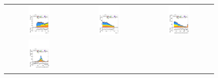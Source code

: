 \begin{figure}[htbp]
    \centering
    \setlength{\tabcolsep}{1.5pt}
    \renewcommand{\arraystretch}{0}
  
    \begin{tabular}{@{}c c c@{}}
      \includegraphics[width=0.33\textwidth]{images/modelling_tmva_vars/plot_ditau_dr_hh_tth.pdf} &
      \includegraphics[width=0.33\textwidth]{images/modelling_tmva_vars/plot_ditau_deta_hh_tth.pdf} &
      \includegraphics[width=0.33\textwidth]{images/modelling_tmva_vars/plot_met_reco_et_hh_tth.pdf} \\[4pt]
      \includegraphics[width=0.33\textwidth]{images/modelling_tmva_vars/plot_mWbest_hh_tth.pdf} &

\end{tabular}
\end{figure}
